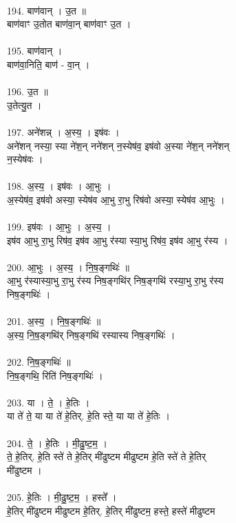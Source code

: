 \\
194. बाण॑वान् । उ॒त ॥\\
बाण॑वाꣳ उ॒तोत बाण॑वा॒न् बाण॑वाꣳ उ॒त ।\\
\\
195. बाण॑वान् ।\\
बाण॑वा॒निति॒ बाण॑ - वा॒न् ।\\
\\
196. उ॒त ॥\\
उ॒तेत्यु॒त ।\\
\\
197. अने॑शन्न् । अ॒स्य॒ । इष॑वः ।\\
अने॑शन् नस्या॒ स्या ने॑श॒न् नने॑शन् न॒स्येष॑व॒ इष॑वो अ॒स्या ने॑श॒न् नने॑शन्\\
न॒स्येष॑वः ।\\
\\
198. अ॒स्य॒ । इष॑वः । आ॒भुः ।\\
अ॒स्येष॑व॒ इष॑वो अस्या॒ स्येष॑व आ॒भु रा॒भु रिष॑वो अस्या॒ स्येष॑व आ॒भुः ।\\
\\
199. इष॑वः । आ॒भुः । अ॒स्य॒ ।\\
इष॑व आ॒भु रा॒भु रिष॑व॒ इष॑व आ॒भु र॑स्या स्या॒भु रिष॑व॒ इष॑व आ॒भु र॑स्य ।\\
\\
200. आ॒भुः । अ॒स्य॒ । नि॒ष॒ङ्गथिः॑ ॥\\
आ॒भु र॑स्यास्या॒भु रा॒भु र॑स्य निष॒ङ्गथि॑र् निष॒ङ्गथि॑ रस्या॒भु रा॒भु र॑स्य\\
निष॒ङ्गथिः॑ ।\\
\\
201. अ॒स्य॒ । नि॒ष॒ङ्गथिः॑ ॥\\
अ॒स्य॒ नि॒ष॒ङ्गथि॑र् निष॒ङ्गथि॑ रस्यास्य निष॒ङ्गथिः॑ ।\\
\\
202. नि॒ष॒ङ्गथिः॑ ॥\\
नि॒ष॒ङ्गथि॒ रिति॑ निष॒ङ्गथिः॑ ।\\
\\
203. या । ते॒ । हे॒तिः ।\\
या ते॑ ते॒ या या ते॑ हे॒तिर्. हे॒ति स्ते॒ या या ते॑ हे॒तिः ।\\
\\
204. ते॒ । हे॒तिः । मी॒ढु॒ष्ट॒म॒ ।\\
ते॒ हे॒तिर्. हे॒ति स्ते॑ ते हे॒तिर् मी॑ढुष्टम मीढुष्टम हे॒ति स्ते॑ ते हे॒तिर्\\
मी॑ढुष्टम ।\\
\\
205. हे॒तिः । मी॒ढु॒ष्ट॒म॒ । हस्ते᳚ ।\\
हे॒तिर् मी॑ढुष्टम मीढुष्टम हे॒तिर्. हे॒तिर् मी॑ढुष्टम॒ हस्ते॒ हस्ते॑ मीढुष्टम\\
